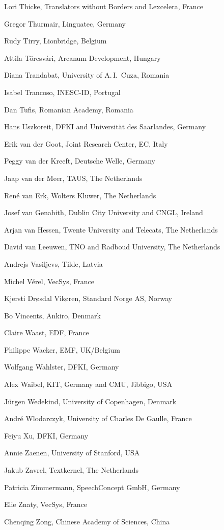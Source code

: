 \documentclass[10pt, plain]{../../metanetpaper}
\begin{document}
\begin{multicols}{3}
\begin{small}
\begin{enumerate}
{      \item Lori Thicke, Translators without Borders and Lexcelera, France
      \item Gregor Thurmair, Linguatec, Germany
      \item Rudy Tirry, Lionbridge, Belgium
      \item Attila Törcsvári, Arcanum Development, Hungary
      \item Diana Trandabat, University of A.\,I.~Cuza, Romania
      \item Isabel Trancoso, INESC-ID, Portugal
      \item Dan Tufis, Romanian Academy, Romania
      \item Hans Uszkoreit, DFKI and Universität des Saarlandes, Germany
      \item Erik van der Goot, Joint Research Center, EC, Italy
      \item Peggy van der Kreeft, Deutsche Welle, Germany
      \item Jaap van der Meer, TAUS, The Netherlands
      \item René van Erk, Wolters Kluwer, The Netherlands
      \item Josef van Genabith, Dublin City University and CNGL, Ireland
      \item Arjan van Hessen, Twente University and Telecats, The Netherlands
      \item David van Leeuwen, TNO and Radboud University, The Netherlands
      \item Andrejs Vasiljevs, Tilde, Latvia
      \item Michel Vérel, VecSys, France
      \item Kjersti Drøsdal Vikøren, Standard Norge AS, Norway
      \item Bo Vincents, Ankiro, Denmark
      \item Claire Waast, EDF, France
      \item Philippe Wacker, EMF, UK/Belgium
      \item Wolfgang Wahlster, DFKI, Germany
      \item Alex Waibel, KIT, Germany and CMU, Jibbigo, USA
      \item Jürgen Wedekind, University of Copenhagen, Denmark
      \item André Wlodarczyk, University of Charles De Gaulle, France
      \item Feiyu Xu, DFKI, Germany
      \item Annie Zaenen, University of Stanford, USA
      \item Jakub Zavrel, Textkernel, The Netherlands
      \item Patricia Zimmermann, SpeechConcept GmbH, Germany
      \item Elie Znaty, VecSys, France
      \item Chenqing Zong, Chinese Academy of Sciences, China
    }
  \end{enumerate}
\end{small}
\end{multicols}
  
\end{document}
